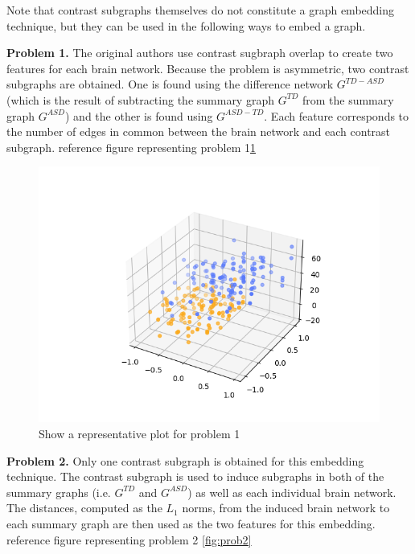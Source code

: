 \documentclass[letterpaper]{article}
\begin{document}
Note that contrast subgraphs themselves do not constitute a graph embedding technique, but they can be used in the following ways to embed a graph.

\textbf{Problem 1.}
The original authors use contrast sugbraph overlap to create two features for each brain network.
Because the problem is asymmetric, two contrast subgraphs are obtained.
One is found using the difference network $G^{TD - ASD}$ (which is the result of subtracting the summary graph $G^{TD}$ from the summary graph $G^{ASD}$) and the other is found using $G^{ASD - TD}$.
Each feature corresponds to the number of edges in common between the brain network and each contrast subgraph.
reference figure representing problem 1\ref{fig:prob1} 

\begin{figure}
    \centering
    \includegraphics[width=\columnwidth, keepaspectratio=true]{test.png}
    \caption{Show a representative plot for problem 1}
    \label{fig:prob1}
\end{figure}

\textbf{Problem 2.}
Only one contrast subgraph is obtained for this embedding technique.
The contrast subgraph is used to induce subgraphs in both of the summary graphs (i.e. $G^{TD}$ and $G^{ASD}$) as well as each individual brain network.
The distances, computed as the $L_1$ norms, from the induced brain network to each summary graph are then used as the two features for this embedding.
reference figure representing problem 2 \ref{fig:prob2}
\end{document}

